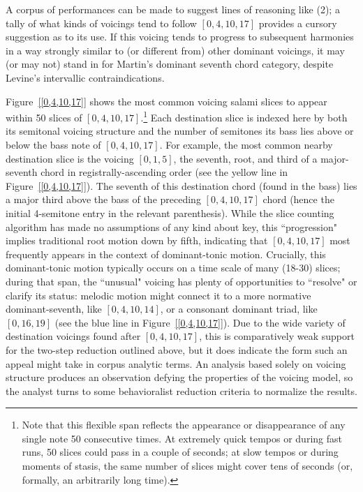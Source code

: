 A corpus of performances can be made to suggest lines of reasoning like (2); a tally of what kinds of voicings tend to follow $[0,4,10,17]$ provides a cursory suggestion as to its use.  If this voicing tends to progress to subsequent harmonies in a way strongly similar to (or different from) other dominant voicings, it may (or may not) stand in for Martin's dominant seventh chord category, despite Levine's intervallic contraindications.

Figure~\ref{[0,4,10,17]} shows the most common voicing salami slices to appear within 50 slices of $[0,4,10,17]$.\footnote{Note that this flexible span reflects the appearance or disappearance of any single note 50 consecutive times.  At extremely quick tempos or during fast runs, 50 slices could pass in a couple of seconds; at slow tempos or during moments of stasis, the same number of slices might cover tens of seconds (or, formally, an arbitrarily long time).}  Each destination slice is indexed here by both its semitonal voicing structure and the number of semitones its bass lies above or below the bass note of $[0,4,10,17]$.  For example, the most common nearby destination slice is the voicing $[0,1,5]$, the seventh, root, and third of a major-seventh chord in registrally-ascending order (see the yellow line in Figure~\ref{[0,4,10,17]}). The seventh of this destination chord (found in the bass) lies a major third above the bass of the preceding $[0,4,10,17]$ chord (hence the initial 4-semitone entry in the relevant parenthesis).  While the slice counting algorithm has made no assumptions of any kind about key, this ``progression" implies traditional root motion down by fifth, indicating that $[0,4,10,17]$ most frequently appears in the context of dominant-tonic motion.  Crucially, this dominant-tonic motion typically occurs on a time scale of many (18-30) slices; during that span, the ``unusual" voicing has plenty of opportunities to ``resolve" or clarify its status: melodic motion might connect it to a more normative dominant-seventh, like $[0,4,10,14]$, or a consonant dominant triad, like $[0,16,19]$ (see the blue line in Figure~\ref{[0,4,10,17]}).  Due to the wide variety of destination voicings found after $[0,4,10,17]$, this is comparatively weak support for the two-step reduction outlined above, but it does indicate the form such an appeal might take in corpus analytic terms.  An analysis based solely on voicing structure produces an observation defying the properties of the voicing model, so the analyst turns to some behavioralist reduction criteria to normalize the results.

